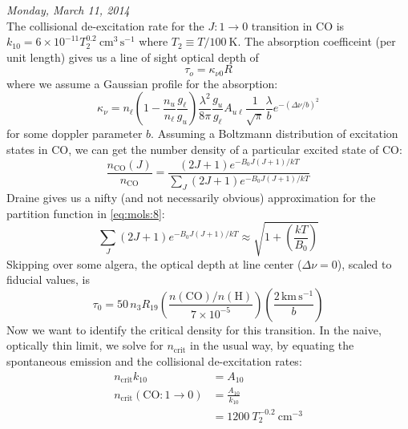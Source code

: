 \documentclass[10pt]{article}
\numberwithin{equation}{section}
\newcommand{\n}{\noindent}
\begin{document}
  \n \textit{Monday, March 11, 2014}\\
  
  \n The collisional de-excitation rate for the $J:1\to0$ transition in CO is
  $k_{10} = 6\times 10^{-11}T_2^{0.2}\ \mathrm{cm^3\,s^{-1}}$ where $T_2 \equiv
  T/100\ \mathrm{K}$. The absorption coefficeint (per unit length) gives us a
  line of sight optical depth of
  \begin{equation}
    \label{eq:mols:6} \tau_o = \kappa_{\nu0}R
  \end{equation}
  where we assume a Gaussian profile for the absorption:
  \begin{equation}
    \label{eq:mols:7} \kappa_\nu = n_\ell\left(1-\frac{n_u}{n_\ell}
    \frac{g_\ell}{g_u}\right) \frac{\lambda^2}{8\pi} \frac{g_u}{g_\ell}
    A_{u\ell} \frac{1}{\sqrt{\pi}} \frac{\lambda}{b} e^{-\left(\Delta
    \nu/b\right)^2}
  \end{equation}
  for some doppler parameter $b$. Assuming a Boltzmann distribution of
  excitation states in CO, we can get the number density of a particular
  excited state of CO:
  \begin{equation}
    \label{eq:mols:8} \frac{n_{\mathrm{CO}}(J)}{n_{\mathrm{CO}}} = \frac{(2J+1)
    e^{-B_0 J(J+1)/kT}}{ \sum_J (2J+1) e^{-B_0 J(J+1)/kT}}
  \end{equation}
  Draine gives us a nifty (and not necessarily obvious) approximation for the
  partition function in \eqref{eq:mols:8}:
  \begin{equation}
    \label{eq:mols:9} \sum_J (2J+1) e^{-B_0 J(J+1)/kT} \approx \sqrt{1 +
    \left(\frac{kT}{B_0}\right)}
  \end{equation}
  Skipping over some algera, the optical depth at line center ($\Delta \nu =
  0$), scaled to fiducial values, is
  \begin{equation}
    \label{eq:mols:10} \tau_0 = 50\, n_3 R_{19}
    \left(\frac{n(\mathrm{CO})/n(\mathrm{H})}{7\times 10^{-5}}\right)
    \left(\frac{2\,\mathrm{km\,s^{-1}}}{b}\right)
  \end{equation}
  Now we want to identify the critical density for this transition. In the
  naive, optically thin limit, we solve for $n_{\mathrm{crit}}$ in the usual
  way, by equating the spontaneous emission and the collisional de-excitation
  rates:
  \begin{align}
    \label{eq:mols:11} n_{\mathrm{crit}} k_{10} &= A_{10}\\
    \label{eq:mols:12} n_{\mathrm{crit}}(\mathrm{CO:1\to0}) &=
    \frac{A_{10}}{k_{10}}\\
    \label{eq:mols:13} &= 1200\ T_2^{-0.2}\ \mathrm{cm^{-3}}
  \end{align}
\end{document}
